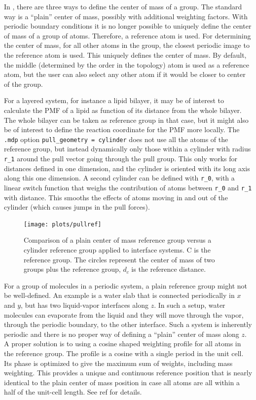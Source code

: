 In {\gromacs}, there are three ways to define the center of mass of a group.
The standard way is a ``plain'' center of mass, possibly with additional
weighting factors. With periodic boundary conditions it is no longer
possible to uniquely define the center of mass of a group of atoms.
Therefore, a reference atom is used. For determining the center of mass,
for all other atoms in the group, the closest periodic image to the reference
atom is used. This uniquely defines the center of mass.
By default, the middle (determined by the order in the topology) atom
is used as a reference atom, but the user can also select any other atom
if it would be closer to center of the group.

For a layered system, for instance a lipid bilayer, it may be of interest
to calculate the PMF of a lipid as function of its distance
from the whole bilayer. The whole bilayer can be taken as reference
group in that case, but it might also be of interest to define the
reaction coordinate for the PMF more locally. The {\tt .mdp} option
{\tt pull_geometry = cylinder} does not
use all the atoms of the reference group, but instead dynamically only those
within a cylinder with radius {\tt r_1} around the pull vector going
through the pull group. This only
works for distances defined in one dimension, and the cylinder is
oriented with its long axis along this one dimension. A second cylinder
can be defined with {\tt r_0}, with a linear switch function that weighs
the contribution of atoms between {\tt r_0} and {\tt r_1} with
distance. This smooths the effects of atoms moving in and out of the
cylinder (which causes jumps in the pull forces).

\begin{figure}
\centerline{\texttt{[image: plots/pullref]}}
\caption{Comparison of a plain center of mass reference group versus a cylinder
reference group applied to interface systems. C is the reference group.
The circles represent the center of mass of two groups plus the reference group,
$d_c$ is the reference distance.}
\label{fi:pullref} 
\end{figure}   

For a group of molecules in a periodic system, a plain reference group
might not be well-defined. An example is a water slab that is connected
periodically in $x$ and $y$, but has two liquid-vapor interfaces along $z$.
In such a setup, water molecules can evaporate from the liquid and they
will move through the vapor, through the periodic boundary, to the other
interface. Such a system is inherently periodic and there is no proper way
of defining a ``plain'' center of mass along $z$. A proper solution is to using
a cosine shaped weighting profile for all atoms in the reference group.
The profile is a cosine with a single period in the unit cell. Its phase
is optimized to give the maximum sum of weights, including mass weighting.
This provides a unique and continuous reference position that is nearly
identical to the plain center of mass position in case all atoms are all
within a half of the unit-cell length. See ref \cite{Engin2010a} for details.


